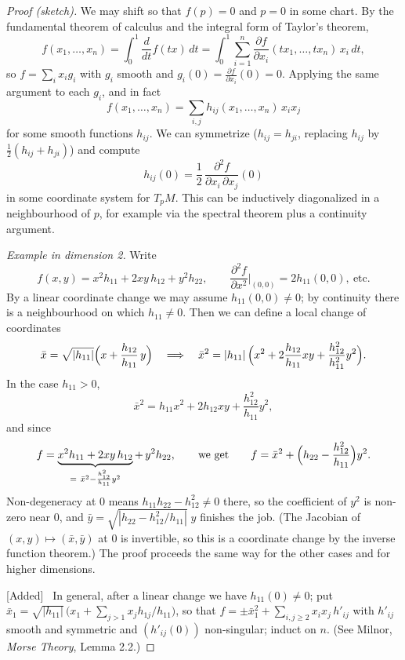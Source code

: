 \documentclass[11pt,openany]{book}
\theoremstyle{plain}
\theoremstyle{definition}
\theoremstyle{remark}
\newcommand{\added}[1]{{\color{addcol}#1}}
\newcommand{\fixed}[1]{\marginpar{\raggedright\scriptsize\color{flagcol}\textbf{Fix:} #1}}
\newenvironment{addedblock}{\par\color{addcol}\noindent\textsf{\small[Added]}\ }{\par}
\newcommand{\abs}[1]{\left\lvert #1 \right\rvert}
\begin{document}
\begin{proof}[Proof (sketch)]
We may shift so that $f(p)=0$ \added{and $p=0$ in some chart}. By the fundamental theorem of
calculus and the integral form of Taylor's theorem,
\[
  f(x_1,\dots,x_n)=\int_0^1 \frac{d}{dt}f(tx)\,dt
  =\int_0^1\sum_{i=1}^n \frac{\partial f}{\partial x_i}(tx_1,\dots,tx_n)\,x_i\,dt ,
\]
\added{so $f=\sum_i x_i g_i$ with $g_i$ smooth and $g_i(0)=\frac{\partial f}{\partial x_i}(0)=0$.
Applying the same argument to each $g_i$,}
and in fact
\[
  f(x_1,\dots,x_n)=\sum_{i,j} h_{ij}(x_1,\dots,x_n)\,x_ix_j
\]
for some smooth functions $h_{ij}$. We can symmetrize ($h_{ij}=h_{ji}$, replacing $h_{ij}$
by $\tfrac12(h_{ij}+h_{ji})$) and compute
\[
  h_{ij}(0)=\frac12\,\frac{\partial^2 f}{\partial x_i\,\partial x_j}(0)
\]
\fixed{notes: $\partial f$ for $\partial^2 f$}
in some coordinate system for $T_pM$.
This can be inductively diagonalized in a neighbourhood of $p$, for example via the
spectral theorem plus a continuity argument.

\emph{Example in dimension 2.} Write
\[
  f(x,y)=x^2h_{11}+2xy\,h_{12}+y^2h_{22},
  \qquad \frac{\partial^2 f}{\partial x^2}\Big|_{(0,0)}=2h_{11}(0,0),\ \text{etc.}
\]
By a \added{linear} coordinate change we may assume $h_{11}(0,0)\neq0$; by continuity there is
a neighbourhood on which $h_{11}\neq0$. Then we can define a local change of coordinates
\[
  \bar x=\sqrt{\abs{h_{11}}}\Bigl(x+\frac{h_{12}}{h_{11}}\,y\Bigr)
  \quad\Longrightarrow\quad
  \bar x^2=\abs{h_{11}}\Bigl(x^2+2\frac{h_{12}}{h_{11}}xy+\frac{h_{12}^2}{h_{11}^2}y^2\Bigr).
\]
In the case $h_{11}>0$,
\[
  \bar x^2=h_{11}x^2+2h_{12}xy+\frac{h_{12}^2}{h_{11}}y^2 ,
\]
and since
\[
  f=\underbrace{x^2h_{11}+2xy\,h_{12}}_{=\ \bar x^2-\frac{h_{12}^2}{h_{11}}y^2}+\,y^2h_{22},
  \qquad\text{we get}\qquad
  f=\bar x^2+\Bigl(h_{22}-\frac{h_{12}^2}{h_{11}}\Bigr)y^2 .
\]
\added{Non-degeneracy at $0$ means $h_{11}h_{22}-h_{12}^2\neq0$ there, so the coefficient of $y^2$
is non-zero near $0$, and $\bar y=\sqrt{\abs{h_{22}-h_{12}^2/h_{11}}}\;y$ finishes the job.
(The Jacobian of $(x,y)\mapsto(\bar x,\bar y)$ at $0$ is invertible, so this is a coordinate
change by the inverse function theorem.)}
The proof proceeds the same way for the other cases and for higher dimensions.
\begin{addedblock}
In general, after a linear change we have $h_{11}(0)\ne0$; put
$\bar x_1=\sqrt{\abs{h_{11}}}\,\bigl(x_1+\sum_{j>1}x_jh_{1j}/h_{11}\bigr)$, so that
$f=\pm\bar x_1^2+\sum_{i,j\ge2}x_ix_j\,h'_{ij}$ with $h'_{ij}$ smooth and symmetric and
$(h'_{ij}(0))$ non-singular; induct on $n$. (See Milnor, \emph{Morse Theory}, Lemma 2.2.)
\end{addedblock}
\end{proof}
\end{document}
